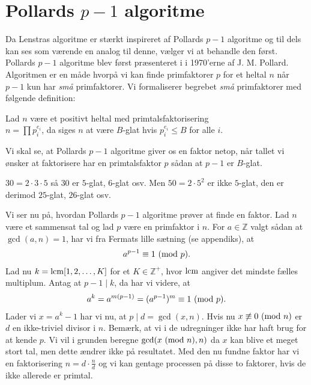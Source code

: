\section{Pollards $p-1$ algoritme}
Da Lenstras algoritme er stærkt inspireret af Pollards $p-1$ algoritme og til dels kan ses som værende en analog til denne, vælger vi at behandle den først. Pollards $p-1$ algoritme blev først præsenteret i \cite{Pollard} i 1970'erne af J. M. Pollard. Algoritmen er en måde hvorpå vi kan finde primfaktorer $p$ for et heltal $n$ når $p-1$ kun har \textit{små} primfaktorer. Vi formaliserer begrebet \textit{små} primfaktorer med følgende definition:

\begin{definition}
Lad $n$ være et positivt heltal med primtalsfaktorisering \\ $n=\prod p_{i}^{e_i}$, da siges $n$ at være $B$-glat hvis $p_{i}^{e_i} \leq B$ for alle $i$.
\end{definition}
Vi skal se, at Pollards $p-1$ algoritme giver os en faktor netop, når tallet vi ønsker at faktorisere har en primtalsfaktor $p$ sådan at $p-1$ er $B$-glat.
\begin{example}
$30 = 2 \cdot 3 \cdot 5$ så $30$ er $5$-glat, $6$-glat osv.	Men $50 = 2 \cdot 5^2$ er ikke $5$-glat, den er derimod $25$-glat, $26$-glat osv.
\end{example}
Vi ser nu på, hvordan Pollards $p-1$ algoritme prøver at finde en faktor. Lad $n$ være et sammensat tal og lad $p$ være en primfaktor i $n$. For $a \in \mathbb{Z}$ valgt sådan at $\gcd(a, n)=1$, har vi fra Fermats lille sætning (se appendiks), at 
\begin{align*}
	a^{p-1} \equiv 1 \ (\mathrm{mod} \ p).
\end{align*}
Lad nu $k= \mathrm{lcm}[1, 2, \ldots, K]$ for et $K \in \mathbb{Z}^{+}$, hvor $\mathrm{lcm}$ angiver det mindste fælles multiplum. Antag at $p-1 \mid k$, da har vi videre, at
\begin{align*}
	a^{k} = a^{m(p-1)} = (a^{p-1})^m \equiv 1 \ (\mathrm{mod} \ p).
\end{align*}
Lader vi $x = a^{k} - 1$ har vi nu, at $p \mid d = \gcd(x, n)$. Hvis nu $x \not \equiv 0 \ (\mathrm{mod} \ n)$ er $d$ en ikke-triviel divisor i $n$. Bemærk, at vi i de udregninger ikke har haft brug for at kende $p$. Vi vil i grunden beregne $\gcd(x \ (\mathrm{mod} \ n), n)$ da $x$ kan blive et meget stort tal, men dette ændrer ikke på resultatet. Med den nu fundne faktor har vi en faktorisering $n=d \cdot \frac{n}{d}$ og vi kan gentage processen på disse to faktorer, hvis de ikke allerede er primtal. 

